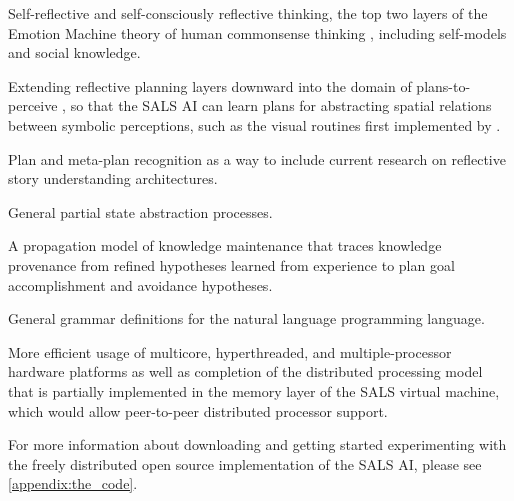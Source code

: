 \begin{packed_enumerate}
\item{Self-reflective and self-consciously reflective thinking, the
  top two layers of the Emotion Machine theory of human commonsense
  thinking \cite[]{minsky:2006}, including self-models and social
  knowledge.}
\item{Extending reflective planning layers downward into the domain of
  plans-to-perceive \cite[]{pryor:1992,pryorcollins:1995,velez:2011},
  so that the SALS AI can learn plans for abstracting spatial
  relations between symbolic perceptions, such as the visual routines
  first implemented by \cite{ullman:1984}.}
\item{Plan and meta-plan recognition as a way to include current
  research on reflective story understanding architectures.}
\item{General partial state abstraction processes.}
\item{A propagation model of knowledge maintenance that traces
  knowledge provenance from refined hypotheses learned from experience
  to plan goal accomplishment and avoidance hypotheses.}
\item{General grammar definitions for the natural language programming
  language.}
\item{More efficient usage of multicore, hyperthreaded, and
  multiple-processor hardware platforms as well as completion of the
  distributed processing model that is partially implemented in the
  memory layer of the SALS virtual machine, which would allow
  peer-to-peer distributed processor support.}
\end{packed_enumerate}
For more information about downloading and getting started
experimenting with the freely distributed open source implementation
of the SALS AI, please see {\mbox{\autoref{appendix:the_code}}}.

